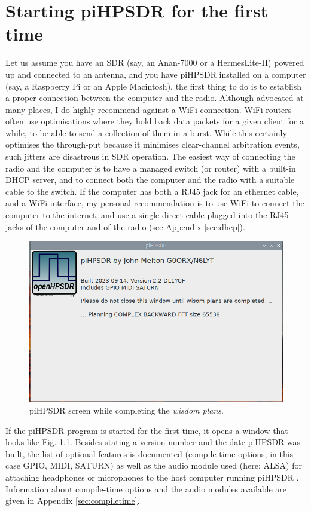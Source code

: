 \documentclass[12pt]{book}
\def\pH{pi\-HPSDR }
\begin{document}
\chapter{Starting \pH for the first time}
Let us assume you have an SDR (say, an Anan-7000 or a HermesLite-II) powered up and connected to an antenna,
and you have \pH installed on a computer (say, a Raspberry Pi or an Apple Macintosh), the first thing to
do is to establish a proper connection between the computer and the radio. Although advocated at many
places,
I do highly recommend against a WiFi connection. WiFi routers often use optimisations where they hold
back data packets for a given client for a while, to be able to send a collection of them in a burst. While
this certainly optimises the through-put because it minimises clear-channel arbitration events, such jitters
are disastrous in SDR operation. The easiest way of connecting the radio and the computer is to have a
managed switch (or router) with a built-in DHCP server, and to connect both the computer and the radio with a suitable
cable to the switch. If the computer has both a RJ45 jack for an ethernet cable, and a WiFi interface, my
personal recommendation is to use WiFi to connect the computer to the internet, and use a single direct
cable plugged
into the RJ45 jacks of the computer and of the radio (see Appendix
\ref{sec:dhcp}).

\begin{figure}
\center
\includegraphics[width=12cm]{Planning.png}
\caption{\pH screen while completing the \textit{wisdom plans}.}
\label{fig:Planning}
\end{figure}

If the \pH program is started for the first time, it opens a window that looks like Fig. \ref{fig:Planning}.
Besides stating a version number and the date \pH was built, the list of optional features is
documented (compile-time options,
in this case  GPIO, MIDI, SATURN) as well as the audio module used (here: ALSA) for attaching headphones
or microphones to the host computer running \pH. Information about compile-time options and the
audio modules available are given in Appendix \ref{sec:compiletime}.
\end{document}
